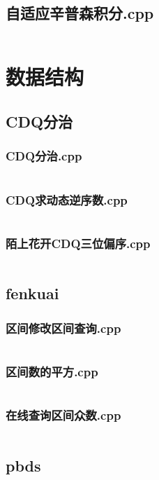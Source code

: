\documentclass[a4paper,11pt]{article}
\begin{document}
\subsection{自适应辛普森积分.cpp}
\inputminted{c++}{"D:/tmplz/templates/数学/自适应辛普森积分.cpp"}
\section{数据结构}
\subsection{CDQ分治}
\subsubsection{CDQ分治.cpp}
\inputminted{c++}{"D:/tmplz/templates/数据结构/CDQ分治/CDQ分治.cpp"}
\subsubsection{CDQ求动态逆序数.cpp}
\inputminted{c++}{"D:/tmplz/templates/数据结构/CDQ分治/CDQ求动态逆序数.cpp"}
\subsubsection{陌上花开CDQ三位偏序.cpp}
\inputminted{c++}{"D:/tmplz/templates/数据结构/CDQ分治/陌上花开CDQ三位偏序.cpp"}
\subsection{fenkuai}
\subsubsection{区间修改区间查询.cpp}
\inputminted{c++}{"D:/tmplz/templates/数据结构/fenkuai/区间修改区间查询.cpp"}
\subsubsection{区间数的平方.cpp}
\inputminted{c++}{"D:/tmplz/templates/数据结构/fenkuai/区间数的平方.cpp"}
\subsubsection{在线查询区间众数.cpp}
\inputminted{c++}{"D:/tmplz/templates/数据结构/fenkuai/在线查询区间众数.cpp"}
\subsection{pbds}
\end{document}
